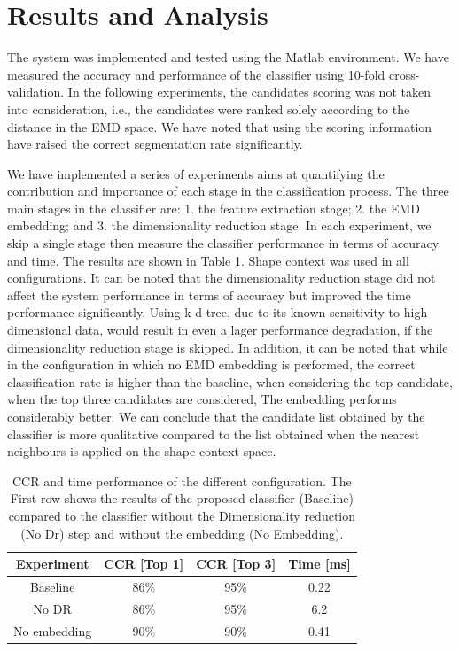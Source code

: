 \documentclass[10pt, conference, compsocconf]{IEEEtran}
\begin{document}
\section{Results and Analysis}
\label{sec:results_analysis}

The system was implemented and tested using the Matlab environment.
We have measured the accuracy and performance of the classifier using 10-fold cross-validation.
In the following experiments, the candidates scoring was not taken into consideration, i.e., the candidates were ranked solely according to the distance in the EMD space.
We have noted that using the scoring information have raised the correct segmentation rate significantly.

We have implemented a series of experiments aims at quantifying the contribution and importance of each stage in the classification process.
The three main stages in the classifier are: 1. the feature extraction stage; 2. the EMD embedding; and 3. the dimensionality reduction stage.
In each experiment, we skip a single stage then measure the classifier performance in terms of accuracy and time.
The results are shown in Table \ref{table:dr_embedding_comparison}.  Shape context was used in all configurations.
It can be noted that the dimensionality reduction stage did not affect the system performance in terms of accuracy but improved the time performance significantly.
Using k-d tree, due to its known sensitivity to high dimensional data, would result in even a lager performance degradation, if the dimensionality reduction stage is skipped.
In addition, it can be noted that while in the configuration in which no EMD embedding is performed, the correct classification rate is higher than the baseline, when considering the top candidate, when the top three candidates are considered, The embedding performs considerably better.
We can conclude that the candidate list obtained by the classifier is more qualitative compared to the list obtained when the nearest neighbours is applied on the shape context space.

\begin{table}
\centering
\begin{tabular}{ | c | c | c | c |}
  \hline
  Experiment  & CCR [Top 1]  & CCR [Top 3] & Time [ms]\\
  \hline                 
  Baseline & 86\% & 95\% & 0.22 \\
  \hline
  No DR & 86\% & 95\% & 6.2 \\ 
  \hline
  No embedding & 90\% &  90\% & 0.41 \\
  \hline
\end{tabular}
\caption{CCR and time performance of the different configuration. 
The First row shows the results of the proposed classifier (Baseline) compared to the classifier without the Dimensionality reduction (No Dr) step and without the embedding (No Embedding).}
\label{table:dr_embedding_comparison} 
\end{table}
\end{document}
